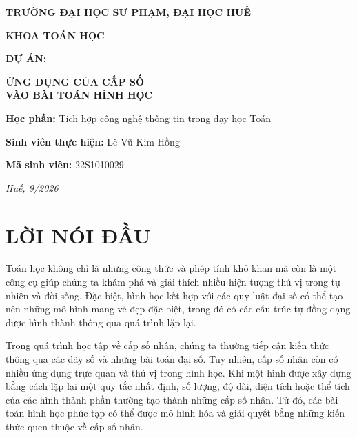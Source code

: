 \documentclass[12pt,a4paper]{article}
\begin{document}
\begin{titlepage}
\thispagestyle{empty}

\begin{center}

{\bfseries\large TRƯỜNG ĐẠI HỌC SƯ PHẠM, ĐẠI HỌC HUẾ}

\vspace{0.15cm}

{\bfseries\large KHOA TOÁN HỌC}

\vspace{2.8cm}

{\bfseries\Large DỰ ÁN:}

\vspace{0.5cm}

{\bfseries\Large
ỨNG DỤNG CỦA CẤP SỐ\\
VÀO BÀI TOÁN HÌNH HỌC
}

\vspace{2.8cm}

{\large
\textbf{Học phần:} Tích hợp công nghệ thông tin trong dạy học Toán
}

\end{center}

\vspace{-0.3cm}
{\large \textbf{Sinh viên thực hiện:} Lê Vũ Kim Hồng}\\
\vspace{-0.3cm}

{\large \textbf{Mã sinh viên:} 22S1010029}


\vfill

\begin{center}
\textit{Huế, 9/2026}
\end{center}

\end{titlepage}
\tableofcontents
\newpage  %
\section*{LỜI NÓI ĐẦU}
Toán học không chỉ là những công thức và phép tính khô khan mà còn là một công cụ giúp chúng ta khám phá và giải thích nhiều hiện tượng thú vị trong tự nhiên và đời sống. Đặc biệt, hình học kết hợp với các quy luật đại số có thể tạo nên những mô hình mang vẻ đẹp đặc biệt, trong đó có các cấu trúc tự đồng dạng được hình thành thông qua quá trình lặp lại.

Trong quá trình học tập về cấp số nhân, chúng ta thường tiếp cận kiến thức thông qua các dãy số và những bài toán đại số. Tuy nhiên, cấp số nhân còn có nhiều ứng dụng trực quan và thú vị trong hình học. Khi một hình được xây dựng bằng cách lặp lại một quy tắc nhất định, số lượng, độ dài, diện tích hoặc thể tích của các hình thành phần thường tạo thành những cấp số nhân. Từ đó, các bài toán hình học phức tạp có thể được mô hình hóa và giải quyết bằng những kiến thức quen thuộc về cấp số nhân.
\end{document}
